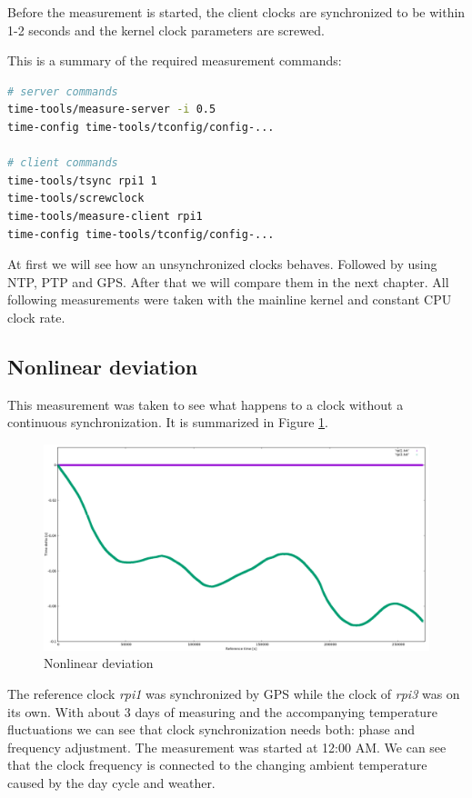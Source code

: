 Before the measurement is started, the client clocks are synchronized to be within 1-2 seconds and the kernel clock parameters are screwed.

This is a summary of the required measurement commands:

\begin{lstlisting}[language=bash]
# server commands
time-tools/measure-server -i 0.5
time-config time-tools/tconfig/config-...

# client commands
time-tools/tsync rpi1 1
time-tools/screwclock
time-tools/measure-client rpi1
time-config time-tools/tconfig/config-...
\end{lstlisting}

At first we will see how an unsynchronized clocks behaves. Followed by using NTP, PTP and GPS. After that we will compare them in the next chapter. All following measurements were taken with the mainline kernel and constant CPU clock rate.

\subsection{Nonlinear deviation}

This measurement was taken to see what happens to a clock without a continuous synchronization. It is summarized in Figure \ref{fig:plot_nonlinear}.

\begin{figure}[H]
	\centering
	\includegraphics[width=1.0\textwidth]{figures/plot_nonlinear.png}
	\caption{Nonlinear deviation}
	\label{fig:plot_nonlinear}
\end{figure}

The reference clock \textit{rpi1} was synchronized by GPS while the clock of \textit{rpi3} was on its own. With about 3 days of measuring and the accompanying temperature fluctuations we can see that clock synchronization needs both: phase and frequency adjustment.
The measurement was started at 12:00 AM. We can see that the clock frequency is connected to the changing ambient temperature caused by the day cycle and weather.

